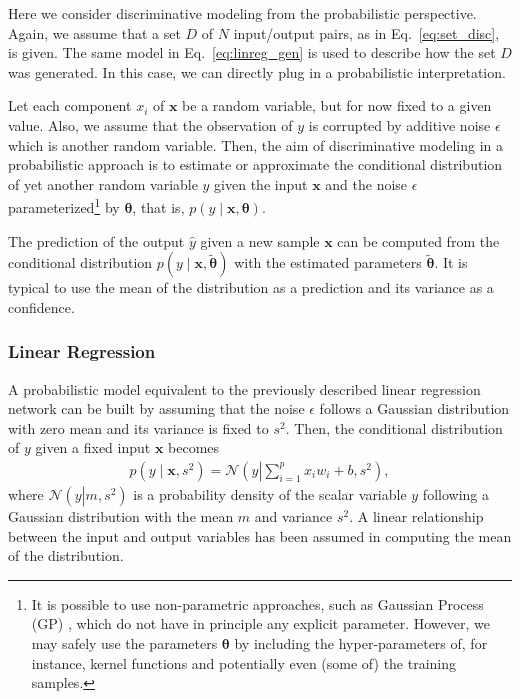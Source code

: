 \documentclass[dissertation,nocontribution]{aaltoseries}
\newcommand{\vect}[1]{\mathbf{#1}}
\newcommand{\vects}[1]{\boldsymbol{#1}}
\newcommand{\vx}[0]{\vect{x}}
\newcommand{\TT}[0]{{\vects{\theta}}}
\newcommand{\NN}[0]{\mathcal{N}}
\begin{document}
Here we consider discriminative modeling from
the probabilistic perspective. Again, we assume that a set
$D$ of $N$ input/output pairs, as in
Eq.~\eqref{eq:set_disc}, is given. The same model in
Eq.~\eqref{eq:linreg_gen} is used to describe how the set
$D$ was generated. In this case, we can directly plug in a
probabilistic interpretation.

Let each component $x_i$ of $\vx$ be a random variable, but
for now fixed to a given value. Also, we assume that the
observation of $y$ is corrupted by additive noise
$\epsilon$ which is another random variable.
Then, the aim of
discriminative modeling in a probabilistic approach is to
estimate or approximate the conditional distribution of
yet another random variable $y$ given the input $\vx$ and
the noise $\epsilon$ parameterized\footnote{It is
possible to use non-parametric approaches, such as Gaussian
Process (GP) \citep[see, e.g.,][]{Rasmussen2006}, which do
not have in principle any explicit parameter. However, we may safely
use the parameters $\TT$ by including the hyper-parameters
of, for instance, kernel functions and potentially even
(some of) the training samples.} by $\TT$, that is, ${p(y \mid \vx,
\TT)}$.

The prediction of the output $\hat{y}$ given a new sample $\vx$
can be computed from the conditional distribution $p(y \mid \vx,
        \tilde{\TT})$ with the estimated parameters
$\tilde{\TT}$. It is typical to use the mean of the distribution
as a prediction and its variance as a confidence.

\subsubsection{Linear Regression}

A probabilistic model equivalent to the previously described
linear regression network can be 
built by assuming
that the noise
$\epsilon$ follows a Gaussian distribution with zero mean
and its variance is fixed to $s^2$. Then, the conditional
distribution of $y$ given a fixed input $\vx$ becomes
\begin{align*}
    p(y \mid \vx, s^2) = \NN \left( y \left| \sum_{i=1}^p
    x_i w_i + b, s^2\right.\right),
\end{align*}
where $\NN \left( y \left| m, s^2\right.\right)$ is a
probability density of the scalar variable $y$ following a Gaussian distribution
with the mean $m$ and variance $s^2$. A linear relationship
between the input and output variables has been assumed in
computing the mean of the distribution.
\end{document}
